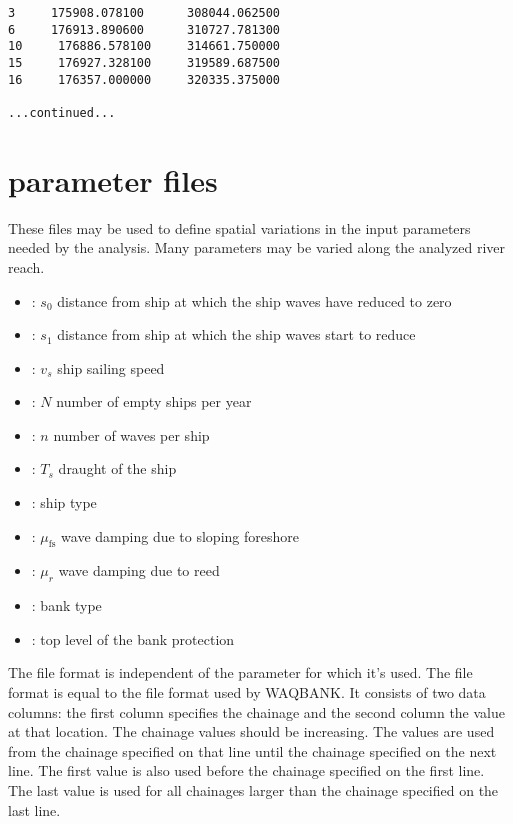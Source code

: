 \begin{Verbatim}
3     175908.078100      308044.062500
6     176913.890600      310727.781300
10     176886.578100     314661.750000
15     176927.328100     319589.687500
16     176357.000000     320335.375000 

...continued...
\end{Verbatim}

\section{parameter files} \label{Sec:parfile}

These files may be used to define spatial variations in the input parameters needed by the analysis.
Many parameters may be varied along the analyzed river reach.

\begin{itemize}
\item {}: $s_0$ distance from ship at which the ship waves have reduced to zero 
\item {}: $s_1$ distance from ship at which the ship waves start to reduce 
\item {}: $v_s$ ship sailing speed 
\item {}: $N$ number of empty ships per year 
\item {}: $n$ number of waves per ship \unitbrackets{-}
\item {}: $T_s$ draught of the ship 
\item {}: ship type \unitbrackets{-}
\item {}: $\mu_\text{fs}$ wave damping due to sloping foreshore 
\item {}: $\mu_r$ wave damping due to reed 
\item {}: bank type \unitbrackets{-}
\item {}: top level of the bank protection 
\end{itemize}

The file format is independent of the parameter for which it's used.
The file format is equal to the file format used by WAQBANK.
It consists of two data columns: the first column specifies the chainage and the second column the value at that location.
The chainage values should be increasing.
The values are used from the chainage specified on that line until the chainage specified on the next line.
The first value is also used before the chainage specified on the first line.
The last value is used for all chainages larger than the chainage specified on the last line.

